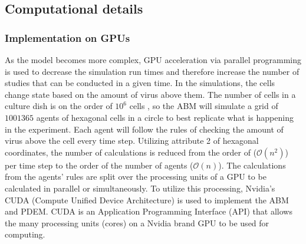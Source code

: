 
\subsection{Computational details}

\subsubsection{Implementation on GPUs}

As the model becomes more complex, GPU acceleration via parallel programming is used to decrease the simulation run times and therefore increase the number of studies that can be conducted in a given time. In the simulations, the cells change state based on the amount of virus above them. The number of cells in a culture dish is on the order of $10^6$ cells \cite{Number_of_cells_in_a_dish_noauthor_useful_nodate}, so the ABM will simulate a grid of $1001365$ agents of hexagonal cells in a circle to best replicate what is happening in the experiment. Each agent will follow the rules of checking the amount of virus above the cell every time step. Utilizing attribute 2 of hexagonal coordinates, the number of calculations is reduced from the order of ($\mathcal{O}(n^2)$) per time step to the order of the number of agents ($\mathcal{O}(n)$). The calculations from the agents' rules are split over the processing units of a GPU to be calculated in parallel or simultaneously. To utilize this processing, Nvidia's CUDA (Compute Unified Device Architecture) is used to implement the ABM and PDEM. CUDA is an Application Programming Interface (API) that allows the many processing units (cores) on a Nvidia brand GPU to be used for computing. %

